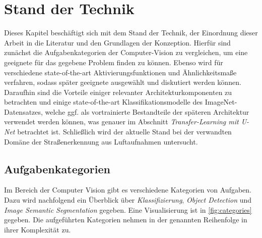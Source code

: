 
\chapter{Stand der Technik}

Dieses Kapitel beschäftigt sich mit dem Stand der Technik, der Einordnung dieser Arbeit in die Literatur 
und den Grundlagen der Konzeption. Hierfür sind zunächst 
die Aufgabenkategorien der Computer-Vision zu vergleichen, um eine geeignete für das gegebene Problem finden zu können.
Ebenso wird für verschiedene state-of-the-art Aktivierungsfunktionen und Ähnlichkeitsmaße verfahren, 
sodass später geeignete ausgewählt und diskutiert werden können. Daraufhin sind 
die Vorteile einiger relevanter Architekturkomponenten zu betrachten und einige 
state-of-the-art Klassifikationsmodelle des ImageNet-Datensatzes, welche ggf. 
als vortrainierte Bestandteile der späteren Architektur verwendet werden können, 
was genauer im Abschnitt \textit{Transfer-Learning mit U-Net} betrachtet ist. 
Schließlich wird der aktuelle Stand bei der verwandten Domäne der Straßenerkennung 
aus Luftaufnahmen untersucht.

\section{Aufgabenkategorien} \label{sec:aufgabenkategorien}

Im Bereich der Computer Vision gibt es verschiedene Kategorien von Aufgaben.
Dazu wird nachfolgend ein Überblick über \textit{Klassifizierung}, \textit{Object Detection} und \textit{Image Semantic Segmentation} gegeben.
Eine Visualisierung ist in \autoref{fig:categories} gegeben.
Die aufgeführten Kategorien nehmen in der genannten Reihenfolge in ihrer Komplexität zu.

